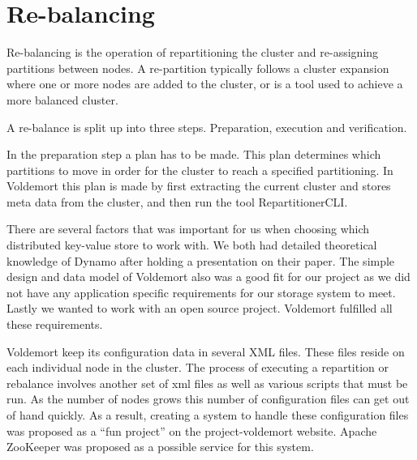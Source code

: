 \section{Re-balancing}
Re-balancing is the operation of repartitioning the cluster and re-assigning partitions between nodes. A re-partition typically follows a cluster expansion where one or more nodes are added to the cluster, or is a tool used to achieve a more balanced cluster. 

A re-balance is split up into three steps. Preparation, execution and verification.

In the preparation step a plan has to be made. This plan determines which partitions to move in order for the cluster to reach a specified partitioning. In Voldemort this plan is made by first extracting the current cluster and stores meta data from the cluster, and then run the tool RepartitionerCLI. 

There are several factors that was important for us when choosing which distributed key-value store to work with. We both had detailed theoretical knowledge of Dynamo after holding a presentation on their paper. The simple design and data model of Voldemort also was a good fit for our project as we did not have any application specific requirements for our storage system to meet. Lastly we wanted to work with an open source project. Voldemort fulfilled all these requirements. 

Voldemort keep its configuration data in several XML files. These files reside on each individual node in the cluster. The process of executing a repartition or rebalance involves another set of xml files as well as various scripts that must be run. As the number of nodes grows this number of configuration files can get out of hand quickly. 
As a result, creating a system to handle these configuration files was proposed as a ``fun project'' on the project-voldemort website. Apache ZooKeeper was proposed as a possible service for this system.  


